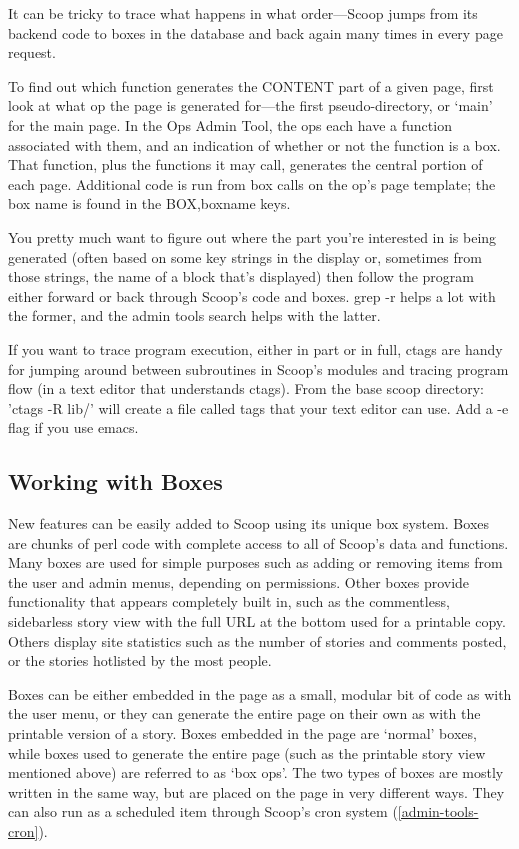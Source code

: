 It can be tricky to trace what happens in what order---Scoop jumps from its backend code to boxes in the database and back again many times in every page request. 

To find out which function generates the \latexhtml{$\vert$}{|}CONTENT\latexhtml{$\vert$}{|} part of a given page, first look at what op the page is generated for---the first pseudo-directory, or `main' for the main page. In the Ops Admin Tool, the ops each have a function associated with them, and an indication of whether or not the function is a box. That function, plus the functions it may call, generates the central portion of each page. Additional code is run from box calls on the op's page template; the box name is found in the \latexhtml{$\vert$}{|}BOX,boxname\latexhtml{$\vert$}{|} keys.

You pretty much want to figure out where the part you're interested in is being generated (often based on some key strings in the display or, sometimes from those strings, the name of a block that's displayed) then follow the program either forward or back through Scoop's code and boxes. grep -r helps a lot with the former, and the admin tools search helps with the latter.

If you want to trace program execution, either in part or in full, ctags are handy for jumping around between subroutines in Scoop's modules and tracing program flow (in a text editor that understands ctags). From the base scoop directory: 'ctags -R lib/' will create a file called tags that your text editor can use. Add a -e flag if you use emacs.

\subsection{Working with Boxes}
\label{hacking-boxes}

New features can be easily added to Scoop using its unique box system.  Boxes are chunks of perl code with complete access to all of Scoop's data and functions.  Many boxes are used for simple purposes such as adding or removing items from the user and admin menus, depending on permissions.  Other boxes provide functionality that appears completely built in, such as the commentless, sidebarless story view with the full URL at the bottom used for a printable copy.  Others display site statistics such as the number of stories and comments posted, or the stories hotlisted by the most people.

Boxes can be either embedded in the page as a small, modular bit of code as with the user menu, or they can generate the entire page on their own as with the printable version of a story. Boxes embedded in the page are `normal' boxes, while boxes used to generate the entire page (such as the printable story view mentioned above) are referred to as `box ops'. The two types of boxes are mostly written in the same way, but are placed on the page in very different ways. They can also run as a scheduled item through Scoop's cron system (\ref{admin-tools-cron}).

